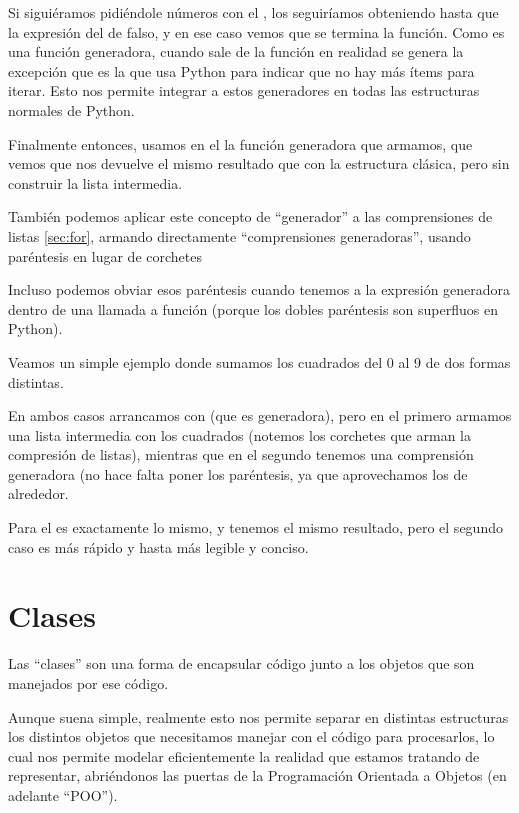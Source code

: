 Si siguiéramos pidiéndole números con el , los seguiríamos obteniendo hasta que la expresión del  de falso, y en ese caso vemos que se termina la función. Como es una función generadora, cuando sale de la función en realidad se genera la excepción  que es la que usa Python para indicar que no hay más ítems para iterar. Esto nos permite integrar a estos generadores en todas las estructuras normales de Python.

Finalmente entonces, usamos en el  la función generadora que armamos, que vemos que nos devuelve el mismo resultado que con la estructura clásica, pero sin construir la lista intermedia.

También podemos aplicar este concepto de ``generador'' a las comprensiones de listas \ref{sec:for}, armando directamente ``comprensiones generadoras'', usando paréntesis en lugar de corchetes


Incluso podemos obviar esos paréntesis cuando tenemos a la expresión generadora dentro de una llamada a función (porque los dobles paréntesis son superfluos en Python).

Veamos un simple ejemplo donde sumamos los cuadrados del 0 al 9 de dos formas distintas. 


En ambos casos arrancamos con  (que es generadora), pero en el primero armamos una lista intermedia con los cuadrados (notemos los corchetes que arman la compresión de listas), mientras que en el segundo tenemos una comprensión generadora (no hace falta poner los paréntesis, ya que aprovechamos los de alrededor.

Para el  es exactamente lo mismo, y tenemos el mismo resultado, pero el segundo caso es más rápido y hasta más legible y conciso.


\section{Clases}\label{sec:clases}

Las ``clases'' son una forma de encapsular código junto a los objetos que son manejados por ese código.

Aunque suena simple, realmente esto nos permite separar en distintas estructuras los distintos objetos que necesitamos manejar con el código para procesarlos, lo cual nos permite modelar eficientemente la realidad que estamos tratando de representar, abriéndonos las puertas de la Programación Orientada a Objetos (en adelante ``POO'').


